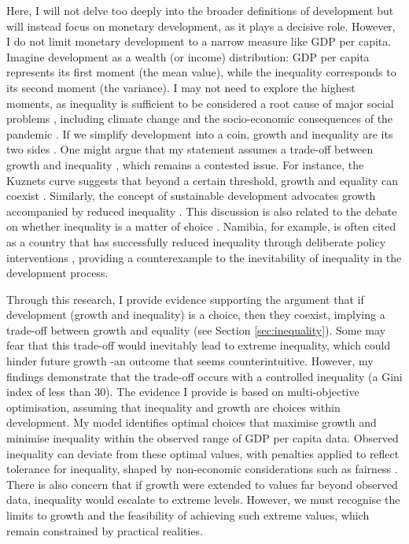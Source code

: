 \documentclass[12pt]{article}
\begin{document}
Here, I will not delve too deeply into the broader definitions of development but will instead focus on monetary development, as it plays a decisive role. However, I do not limit monetary development to a narrow measure like GDP per capita. Imagine development as a wealth (or income) distribution: GDP per capita represents its first moment (the mean value), while the inequality corresponds to its second moment (the variance). I may not need to explore the highest moments, as inequality is sufficient to be considered a root cause of major social problems \parencite{neckerman2007inequality}, including climate change \parencite{duong2023does} and the socio-economic consequences of the pandemic \parencite{stantcheva2022inequalities}. If we simplify development into a coin, growth and inequality are its two sides \parencite{berg2017inequality}. One might argue that my statement assumes a trade-off between growth and inequality \parencite{okun2010equality}, which remains a contested issue. For instance, the Kuznets curve suggests that beyond a certain threshold, growth and equality can coexist \parencite{nielsen1997kuznets}. Similarly, the concept of sustainable development advocates growth accompanied by reduced inequality \parencite{freistein2016potential}. This discussion is also related to the debate on whether inequality is a matter of choice \parencite{stiglitz2013inequality}. Namibia, for example, is often cited as a country that has successfully reduced inequality through deliberate policy interventions \parencite{lawson2017inequality}, providing a counterexample to the inevitability of inequality in the development process.

Through this research, I provide evidence supporting the argument that if development (growth and inequality) is a choice, then they coexist, implying a trade-off between growth and equality (see Section \ref{sec:inequality}). Some may fear that this trade-off would inevitably lead to extreme inequality, which could hinder future growth \parencite{berg2017inequality} -an outcome that seems counterintuitive. However, my findings demonstrate that the trade-off occurs with a controlled inequality (a Gini index of less than 30). The evidence I provide is based on multi-objective optimisation, assuming that inequality and growth are choices within development. My model identifies optimal choices that maximise growth and minimise inequality within the observed range of GDP per capita data. Observed inequality can deviate from these optimal values, with penalties applied to reflect tolerance for inequality, shaped by non-economic considerations such as fairness \parencite{cojocaru2014fairness}. There is also concern that if growth were extended to values far beyond observed data, inequality would escalate to extreme levels. However, we must recognise the limits to growth \parencite{meadows2018limits} and the feasibility of achieving such extreme values, which remain constrained by practical realities.
\end{document}

